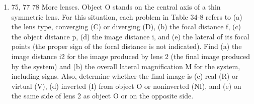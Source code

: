 \documentclass[fleqn]{article}
\begin{document}
\begin{enumerate}
    \item 75, 77 78 More lenses. Object O stands on the central axis of a thin symmetric lens. For this situation, each problem in Table 34-8 refers to (a) the lens type, converging (C) or diverging (D), (b) the focal distance f, (c) the object distance p, (d) the image distance i, and (e) the lateral of its focal points (the proper sign of the focal distance is not indicated). Find (a) the image distance i2 for the image produced by lens 2 (the final image produced by the system) and (b) the overall lateral magnification M for the system, including signs. Also, determine whether the final image is (c) real (R) or virtual (V), (d) inverted (I) from object O or noninverted (NI), and (e) on the same side of lens 2 as object O or on the opposite side.
    
  \end{enumerate}
\end{document}
